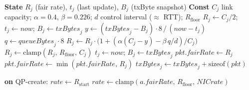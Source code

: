 \documentclass[sigconf, nonacm]{acmart}
\newcommand{\hpccfs}{\textsc{RDMA-RCP}\xspace}
\begin{document}
\begin{algorithm}[t]
\caption{\hpccfs switch --- per egress port $j$}
\label{alg:switch}
\begin{algorithmic}[1]
\State \textbf{State} $R_j$ (fair rate), $t_j$ (last update), $B_j$ (txByte snapshot)
\State \textbf{Const} $C_j$ link capacity; $\alpha{=}0.4$, $\beta{=}0.226$; $d$ control interval ($\approx$ RTT); $R_{\mathrm{floor}}$
     \State $R_j \gets C_j/2$;\; $t_j \gets now$;\; $B_j \gets \mathit{txBytes}_j$ 
  \EndIf
     \State $y \gets (\mathit{txBytes}_j - B_j)\cdot 8 \,/\, (now - t_j)$ 
     \State $q \gets \mathit{queueBytes}_j \cdot 8$ 
     \State $R_j \gets R_j \cdot \big(1 + (\alpha(C_j - y) - \beta\, q/d)/C_j\big)$ 
     \State $R_j \gets \mathrm{clamp}(R_j,\, R_{\mathrm{floor}},\, C_j)$
     \State $t_j \gets now$;\; $B_j \gets \mathit{txBytes}_j$
  \EndIf
   
     \State $pkt.\mathit{fairRate} \gets R_j$
  \Else
     \State $pkt.\mathit{fairRate} \gets \min(pkt.\mathit{fairRate},\, R_j)$ 
  \EndIf
  \State $\mathit{txBytes}_j \gets \mathit{txBytes}_j + \mathrm{sizeof}(pkt)$
\EndProcedure
\end{algorithmic}
\end{algorithm}

\begin{algorithm}[t]
\caption{\hpccfs sender (receiver echoes the header unchanged)}
\label{alg:sender}
\begin{algorithmic}[1]
\State \textbf{on} QP-create:\; $\mathit{rate} \gets R_{\mathrm{start}}$ 
\Statex
{}
   \Return {}\EndIf
  \State $\mathit{rate} \gets \mathrm{clamp}(a.\mathit{fairRate},\, R_{\mathrm{floor}},\, \mathit{NICrate})$ 
\EndProcedure
\end{algorithmic}
\end{algorithm}
\end{document}
